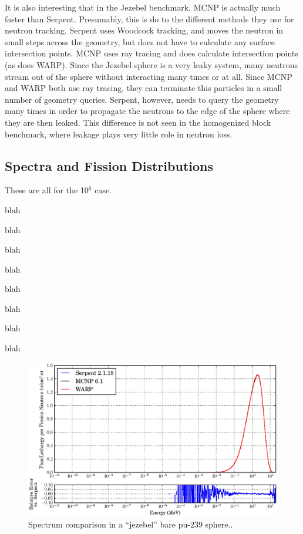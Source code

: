 It is also interesting that in the Jezebel benchmark, MCNP is actually much faster than Serpent.  Presumably, this is do to the different methods they use for neutron tracking.  Serpent uses Woodcock tracking, and moves the neutron in small steps across the geometry, but does not have to calculate any surface intersection points.  MCNP uses ray tracing and does calculate intersection points (as does WARP).  Since the Jezebel sphere is a very leaky system, many neutrons stream out of the sphere without interacting many times or at all.  Since  MCNP and WARP both use ray tracing, they can terminate this particles in a small number of geometry queries.  Serpent, however, needs to query the geometry many times in order to propagate the neutrons to the edge of the sphere where they are then leaked.  This difference is not seen in the homogenized block benchmark, where leakage plays very little role in neutron loss.

\subsection{Spectra and Fission Distributions}

These are all for the 10$^6$ case.

blah

blah

blah

blah

blah

blah

blah

blah

\begin{figure}[h!] 
\centering
\includegraphics[width=\textwidth]{graphics/finalresults/godiva_spec-6.eps}
\caption{Spectrum comparison in a ``jezebel'' bare pu-239 sphere.. \label{godiva_spec} }
\end{figure}

